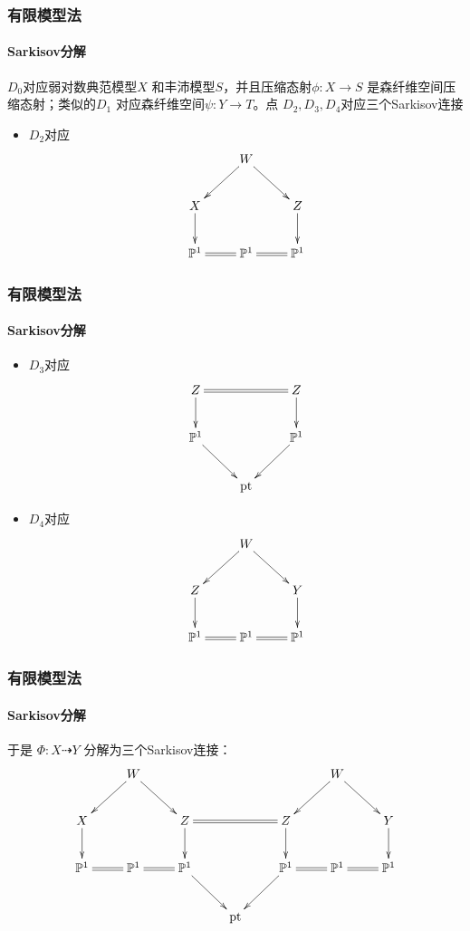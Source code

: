 \documentclass[10pt]{ctexbeamer}
\begin{document}
\begin{frame}[shrink]
  \frametitle{有限模型法}
  \framesubtitle{Sarkisov分解}
  
$D_{0}$对应弱对数典范模型$X$ 和丰沛模型$S$，并且压缩态射$\phi:X\to S$ 是森纤维空间压缩态射；类似的$D_{1}$ 对应森纤维空间$\psi:Y\to T$。点 $D_{2},D_{3},D_{4}$对应三个Sarkisov连接

\begin{itemize}
  \pause
  \item 
$D_{2}$对应
\[ \xymatrix{
                         & W\ar[ld]\ar[rd]          & \\
    X\ar[d]              &                          & Z\ar[d]\\
\mathbb{P}^{1}\ar@{=}[r] & \mathbb{P}^{1}\ar@{=}[r] & \mathbb{P}^{1} } \]
\end{itemize}
\end{frame}

\begin{frame}[shrink]
  \frametitle{有限模型法}
  \framesubtitle{Sarkisov分解}
\begin{itemize}
  \item $D_{3}$对应
\[ \xymatrix{
    Z\ar[d]\ar@{=}[rr]    &           & Z\ar[d] \\
    \mathbb{P}^{1}\ar[dr] &           & \mathbb{P}^{1}\ar[dl] \\
                          & \text{pt} & } \]
  \pause
  \item $D_{4}$对应
\[ \xymatrix{
                         & W\ar[ld]\ar[rd]          & \\
    Z\ar[d]              &                          & Y\ar[d]\\
\mathbb{P}^{1}\ar@{=}[r] & \mathbb{P}^{1}\ar@{=}[r] & \mathbb{P}^{1} } \]
\end{itemize}
\end{frame}

\begin{frame}[shrink]
  \frametitle{有限模型法}
  \framesubtitle{Sarkisov分解}
于是 $\Phi: X\dashrightarrow  Y$ 分解为三个Sarkisov连接：
\[ \xymatrix{
                                   & W\ar[ld]\ar[rd]          &                       &           &                                 & W\ar[ld]\ar[rd] \\
    X\ar[d]                        &                          & Z\ar[d]\ar@{=}[rr]    &           & Z\ar[d]                         &                           & Y\ar[d]\\
    \mathbb{P}^{1}\ar@{=}[r]       & \mathbb{P}^{1}\ar@{=}[r] & \mathbb{P}^{1}\ar[dr] &           & \mathbb{P}^{1}\ar[dl]\ar@{=}[r] & \mathbb{P}^{1}\ar@{=}[r] & \mathbb{P}^{1} \\
                                   &                          &                       & \text{pt} &                                 &                           & }\]
\end{frame}
\end{document}
